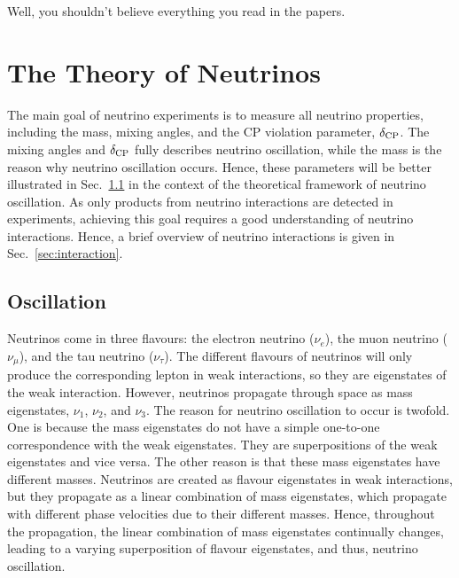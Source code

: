 \begin{savequote}[8cm]
Well, you shouldn’t believe
everything you read in the papers.


\end{savequote}

\chapter{\label{ch:nu-theo}The Theory of Neutrinos}
\minitoc
The main goal of neutrino experiments is to measure all neutrino properties, including the mass, mixing angles, and the CP violation parameter, $\delta_\textrm{CP}$. 
The mixing angles and $\delta_\textrm{CP}$ fully describes neutrino oscillation, while the mass is the reason why neutrino oscillation occurs.
Hence, these parameters will be better illustrated in Sec.~\ref{sec:oscillation} in the context of the theoretical framework of neutrino oscillation.
As only products from neutrino interactions are detected in experiments, achieving this goal requires a good understanding of neutrino interactions.
Hence, a brief overview of neutrino interactions is given in Sec.~\ref{sec:interaction}.

\section{Oscillation}
\label{sec:oscillation}
Neutrinos come in three flavours: the electron neutrino ($\nu_e$), the muon neutrino ($\nu_\mu$), and the tau neutrino ($\nu_\tau$).
The different flavours of neutrinos will only produce the corresponding lepton in weak interactions, so they are eigenstates of the weak interaction.
However, neutrinos propagate through space as mass eigenstates, $\nu_1$, $\nu_2$, and $\nu_3$.
The reason for neutrino oscillation to occur is twofold.
One is because the mass eigenstates do not have a simple one-to-one correspondence with the weak eigenstates. 
They are superpositions of the weak eigenstates and vice versa.
The other reason is that these mass eigenstates have different masses.
Neutrinos are created as flavour eigenstates in weak interactions, but they propagate as a linear combination of mass eigenstates, which propagate with different phase velocities due to their different masses.
Hence, throughout the propagation, the linear combination of mass eigenstates continually changes, leading to a varying superposition of flavour eigenstates, and thus, neutrino oscillation.

